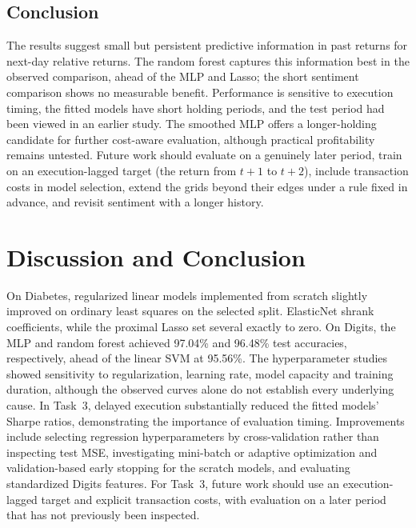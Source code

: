 \documentclass[conference]{IEEEtran}
\begin{document}
\subsection{Conclusion}
\label{sec:t3_conclusion}

The results suggest small but persistent predictive information in past returns for next-day relative returns. The random forest captures this information best in the observed comparison, ahead of the MLP and Lasso; the short sentiment comparison shows no measurable benefit. Performance is sensitive to execution timing, the fitted models have short holding periods, and the test period had been viewed in an earlier study. The smoothed MLP offers a longer-holding candidate for further cost-aware evaluation, although practical profitability remains untested. Future work should evaluate on a genuinely later period, train on an execution-lagged target (the return from $t+1$ to $t+2$), include transaction costs in model selection, extend the grids beyond their edges under a rule fixed in advance, and revisit sentiment with a longer history.


\section{Discussion and Conclusion}
\label{sec:conclusion}
On Diabetes, regularized linear models implemented from scratch slightly improved on ordinary least squares on the selected split. ElasticNet shrank coefficients, while the proximal Lasso set several exactly to zero. On Digits, the MLP and random forest achieved 97.04\% and 96.48\% test accuracies, respectively, ahead of the linear SVM at 95.56\%. The hyperparameter studies showed sensitivity to regularization, learning rate, model capacity and training duration, although the observed curves alone do not establish every underlying cause. In Task~3, delayed execution substantially reduced the fitted models' Sharpe ratios, demonstrating the importance of evaluation timing. Improvements include selecting regression hyperparameters by cross-validation rather than inspecting test MSE, investigating mini-batch or adaptive optimization and validation-based early stopping for the scratch models, and evaluating standardized Digits features. For Task~3, future work should use an execution-lagged target and explicit transaction costs, with evaluation on a later period that has not previously been inspected.
\end{document}
